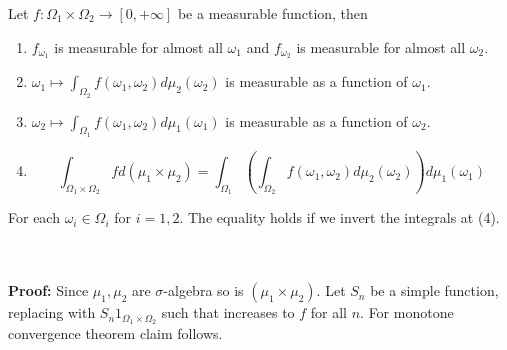 \documentclass[11pt]{scrartcl}
\begin{document}
\begin{theorem}
  Let $f: \Omega_{1} \times \Omega_{2} \longrightarrow [0, +\infty]$ be a measurable function, then
  \begin{enumerate}[1.]
    \item{$f_{\omega_{1}}$ is measurable for almost all $\omega_{1}$ and $f_{\omega_{2}}$ is measurable for almost all $\omega_{2}$.}
    \item{$\omega_{1} \mapsto \int_{\Omega_{2}} f(\omega_{1}, \omega_{2})d\mu_{2}(\omega_{2})$ is measurable as a function of $\omega_{1}$}.
    \item{$\omega_{2} \mapsto \int_{\Omega_{1}} f(\omega_{1}, \omega_{2})d\mu_{1}(\omega_{1})$ is measurable as a function of $\omega_{2}$}.
    \item{}
  $$
  \int_{\Omega_{1} \times \Omega_{2}} f d(\mu_{1} \times \mu_{2}) = \int_{\Omega_{1}} \left( \int_{\Omega_{2}} f(\omega_{1}, \omega_{2}) d\mu_{2}(\omega_{2})  \right) d\mu_{1}(\omega_{1})
  $$
\end{enumerate}
For each $\omega_{i} \in \Omega_{i}$ for $i= 1, 2$. The equality holds if we invert the integrals at (4).
\end{theorem} \\ \\
\textbf{Proof:}
Since $\mu_{1}, \mu_{2}$ are $\sigma$-algebra so is $(\mu_{1} \times \mu_{2})$. Let $S_{n}$ be a simple function, replacing with $S_{n}1_{\Omega_{1} \times \Omega_{2}}$ such that increases to $f$ for all $n$. For monotone convergence theorem claim follows. \\ \\
\end{document}
